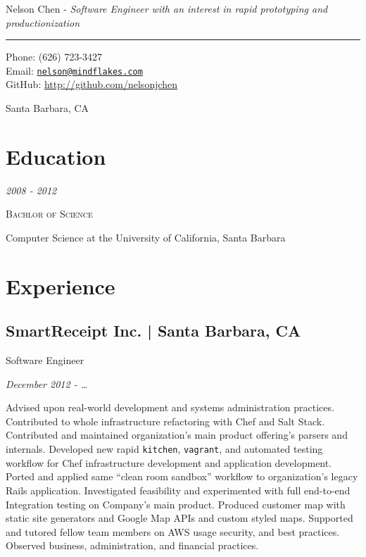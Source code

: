 \documentclass[10pt, letter]{article}
\makeatletter
\def\myname{Nelson Chen}
\def\myemail{nelson@mindflakes.com}
\def\mycellphone{(626) 723-3427}
\def\myaddress{Santa Barbara, CA}
\def\mygithub{nelsonjchen}
\newcommand{\years}[1]{\marginnote{#1}}
\renewcommand{\years}[1]{{\emph{#1}}}
\makeatother
\begin{document}
{\LARGE \myname} - \emph{Software Engineer with an interest in rapid prototyping and productionization}\\
\hrule
\begin{multicols}{2}
{Phone: \mycellphone}\\[.01cm]
{Email: \href{mailto:\myemail}{\texttt{\myemail}}}\\[.05cm]
{GitHub: \href{http://www.github.com/\mygithub}{http://github.com/\mygithub}}

\myaddress


\section*{Education}

\years{2008 - 2012}

\textsc{Bachlor of Science}

Computer Science at the University of California, Santa Barbara

\section*{Experience}

\subsection*{SmartReceipt Inc. | {\footnotesize{Santa Barbara, CA}}}

Software Engineer

\years{December 2012 - \ldots}

Advised upon real-world development and systems administration practices.
Contributed to whole infrastructure refactoring with Chef and Salt Stack.
Contributed and maintained organization's main product offering's parsers and
internals. Developed new rapid \texttt{kitchen}, \texttt{vagrant}, and
automated testing workflow for Chef infrastructure development and application
development. Ported and applied same ``clean room sandbox'' workflow to
organization's legacy Rails application. Investigated feasibility and
experimented with full end-to-end Integration testing on Company's main
product. Produced customer map with static site generators and Google Map APIs
and custom styled maps. Supported and tutored fellow team members on AWS usage
security, and best practices. Observed business, administration, and financial
practices.


\end{multicols}
\end{document}
